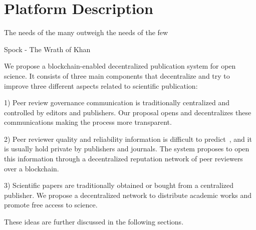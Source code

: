 \chapter{Platform Description}

\begin{FraseCelebre}
  \begin{Frase}
    The needs of the many outweigh the needs of the few
  \end{Frase}
  \begin{Fuente}
    Spock - The Wrath of Khan
  \end{Fuente}
\end{FraseCelebre}


We propose a blockchain-enabled decentralized publication system for open
science. It consists of three main components that decentralize and try to
improve three different aspects related to scientific publication:

1) Peer review governance communication is traditionally centralized and
controlled by editors and publishers. Our proposal opens and decentralizes these
communications making the process more transparent.

2) Peer reviewer quality and reliability information is difficult to
predict~\cite{callaham_relationship_2007}, and it is usually hold private by
publishers and journals. The system proposes to open this information through a
decentralized reputation network of peer reviewers over a blockchain.

3) Scientific papers are traditionally obtained or bought from a centralized
publisher. We propose a decentralized network to distribute academic works and
promote free access to science.

These ideas are further discussed in the following sections.




